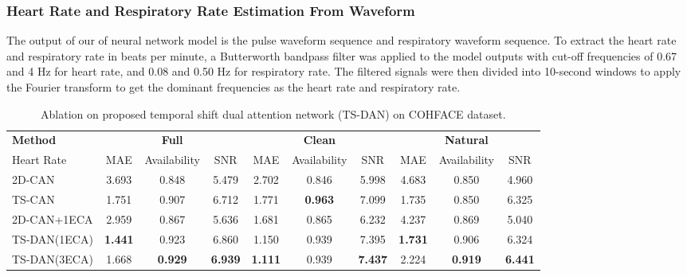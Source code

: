 \documentclass[conference]{IEEEtran}
\begin{document}
\subsubsection{Heart Rate and Respiratory Rate Estimation From Waveform}
The output of our of neural network model is the pulse waveform sequence and respiratory waveform sequence. To extract the heart rate and respiratory rate in beats per minute, a Butterworth bandpass filter was applied to the model outputs with cut-off frequencies of 0.67 and 4 Hz for heart rate, and 0.08 and 0.50 Hz for respiratory rate. The filtered signals were then divided into 10-second windows to apply the Fourier transform to get the dominant frequencies as the heart rate and respiratory rate.

\begin{table*}

\centering
\caption{Ablation on proposed temporal shift dual attention network (TS-DAN) on COHFACE dataset.}
\begin{tabular}{lccc|ccc|ccc}
\hline\noalign{\smallskip}
\bf{Method} & \multicolumn{3}{c}{\bf{Full}}  &  \multicolumn{3}{c}{\bf{Clean}} & \multicolumn{3}{c}{\bf{Natural}}\\
\noalign{\smallskip}
\hline
\noalign{\smallskip}
Heart Rate & MAE & Availability & SNR & MAE & Availability & SNR & MAE & Availability & SNR\\
2D-CAN\cite{chen2018deepphys}   &3.693&0.848&5.479&2.702&  0.846& 5.998&4.683& 0.850& 4.960\\
TS-CAN\cite{liu2020multi}       &1.751&0.907&6.712&1.771&  \textbf{0.963}& 7.099&1.735& 0.850& 6.325 \\
2D-CAN+1ECA                     &2.959&0.867&5.636&1.681& 0.865 & 6.232& 4.237 & 0.869 & 5.040  \\ %
TS-DAN(1ECA)                     &\textbf{1.441}&0.923&6.860&1.150&  0.939& 7.395&\textbf{1.731}& 0.906&6.324  \\
TS-DAN(3ECA)  &1.668&\textbf{0.929}&\textbf{6.939}&\textbf{1.111}&  0.939& \textbf{7.437}&2.224& \textbf{0.919}&\textbf{6.441}    \\
\hline
\end{tabular}
\label{ablation}
\end{table*}
\end{document}
